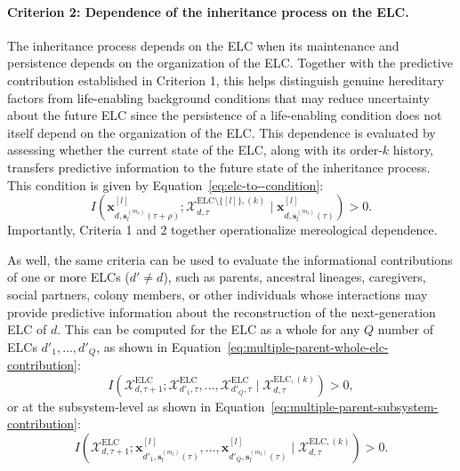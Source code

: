 \documentclass[pdflatex,sn-mathphys-num]{sn-jnl}
\theoremstyle{thmstylethree}
\theoremstyle{thmstyleone}
\newcommand{\ELC}{\mathrm{ELC}}
\begin{document}
\paragraph{Criterion 2: Dependence of the  inheritance process on the ELC.}
The inheritance process depends on the ELC when its maintenance and persistence depends on the organization of the ELC. Together with the predictive contribution established in Criterion 1, this helps distinguish genuine hereditary factors from life-enabling background conditions that may reduce uncertainty about the future ELC since the persistence of a life-enabling condition does not itself depend on the organization of the ELC. This dependence is evaluated by assessing whether the current state of the ELC, along with its order-$k$ history, transfers predictive information to the future state of the inheritance process. This condition is given by Equation~\eqref{eq:elc-to--condition}:
\begin{equation}
\label{eq:elc-to--condition}
I\!\left(
\mathbf{x}^{[l]}_{d,\mathbf{s}^{(m_l)}_l(\tau+\rho)};
\mathcal{X}_{d,\tau}^{\ELC\setminus\{[l]\},(k)}
\mid
\mathbf{x}^{[l]}_{d,\mathbf{s}^{(m_l)}_l(\tau)}
\right)>0.
\end{equation}
Importantly, Criteria 1 and 2 together operationalize mereological dependence. %

As well, the same criteria can be used to evaluate the informational contributions of one or more ELCs ($d' \neq d$), such as parents, ancestral lineages, caregivers, social partners, colony members, or other individuals whose interactions may provide predictive information about the reconstruction of the next-generation ELC of $d$. This can be computed for the ELC as a whole for any $Q$ number of ELCs $d'_1,\ldots,d'_Q$, as shown in Equation~\eqref{eq:multiple-parent-whole-elc-contribution}:
\begin{equation}
\label{eq:multiple-parent-whole-elc-contribution}
I\!\left(
\mathcal{X}^{\ELC}_{d,\tau+1};
\mathcal{X}^{\ELC}_{d'_1,\tau},
\ldots,
\mathcal{X}^{\ELC}_{d'_Q,\tau}
\mid
\mathcal{X}^{\ELC,(k)}_{d,\tau}
\right)>0,
\end{equation}
or at the subsystem-level as shown in Equation~\eqref{eq:multiple-parent-subsystem-contribution}:
\begin{equation}
\label{eq:multiple-parent-subsystem-contribution}
I\!\left(
\mathcal{X}^{\ELC}_{d,\tau+1};
\mathbf{x}^{[l]}_{d'_1,\mathbf{s}^{(m_l)}_l(\tau)},
\ldots,
\mathbf{x}^{[l]}_{d'_Q,\mathbf{s}^{(m_l)}_l(\tau)}
\mid
\mathcal{X}^{\ELC,(k)}_{d,\tau}
\right)>0.
\end{equation}
\end{document}
